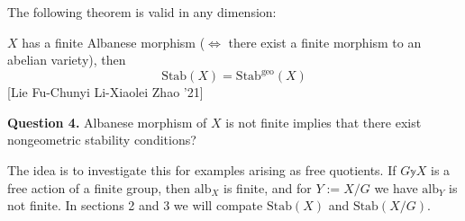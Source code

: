 \medskip\noindent
The following theorem is valid in any dimension:

\begin{theorem}
\label{theorem-Albanese-variety}
$X$ has a finite Albanese morphism ($\iff$ there exist a finite morphism to an
abelian variety), then
$$
\text{Stab}(X) = \text{Stab}^{\text{geo}}(X)
$$
[Lie Fu-Chunyi Li-Xiaolei Zhao '21]
\end{theorem}

\medskip\noindent
{\bf Question 4.} Albanese morphism of $X$ is not finite implies that there
exist nongeometric stability conditions?

\medskip\noindent
The idea is to investigate this for examples arising as free quotients. If 
$G \mathbb{y} X$ is a free action of a finite group, then $\text{alb}_X$ is
finite, and for $Y:=X/G$ we have $\text{alb}_Y$ is not finite. In sections 2 and
3 we will compate $\text{Stab}(X)$ and $\text{Stab}(X/G)$. 

